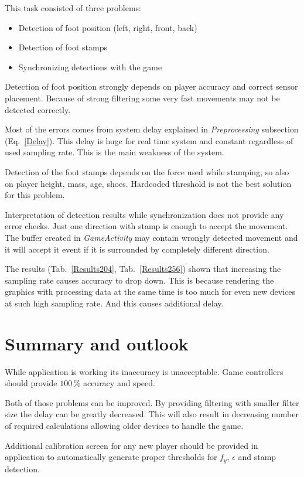 \documentclass[conference]{IEEEtran}
\begin{document}
This task consisted of three problems:
\begin{itemize}
    \item Detection of foot position (left, right, front, back)
    \item Detection of foot stamps
    \item Synchronizing detections with the game
\end{itemize}

Detection of foot position strongly depends on player accuracy and correct sensor placement.
Because of strong filtering some very fast movements may not be detected correctly.

Most of the errors comes from system delay explained in \emph{Preprocessing} subsection (Eq.~\ref{Delay}).
This delay is huge for real time system and constant regardless of used sampling rate.
This is the main weakness of the system.

Detection of the foot stamps depends on the force used while stamping, so also on player height, mass, age, shoes.
Hardcoded threshold is not the best solution for this problem.

Interpretation of detection results while synchronization does not provide any error checks.
Just one direction with stamp is enough to accept the movement.
The buffer created in \emph{GameActivity} may contain wrongly detected movement and it will accept it event if it is surrounded by completely different direction.
 
The results (Tab.~\ref{Results204}, Tab.~\ref{Results256}) shown that increasing the sampling rate causes accuracy to drop down.
This is because rendering the graphics with processing data at the same time is too much for even new devices at such high sampling rate.
And this causes additional delay.

\section{Summary and outlook}

While application is working its inaccuracy is unacceptable. Game controllers should provide $100\,\%$ accuracy and speed.

Both of those problems can be improved. By providing filtering with smaller filter size the delay can be greatly decreased. This will also result in decreasing number of required calculations allowing older devices to handle the game.

Additional calibration screen for any new player should be provided in application to automatically generate proper thresholds for $f_y$, $\epsilon$ and stamp detection.
\end{document}
